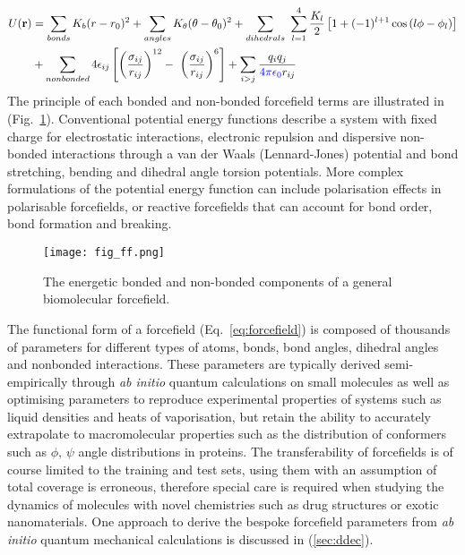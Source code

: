 %
\begin{equation} \label{eq:forcefield}
\begin{split}
U(\mathbf{r}) &= \sum_{bonds} K_b(r - r_0)^2 + \sum_{angles} K_{\theta}(\theta - \theta_0)^2 + \sum_{dihedrals} \, \, \sum_{l=1}^{4} \frac{K_{l}}{2}\left[1+(-1)^{l+1}\cos{(l\phi -\phi_{l})}\right] \\
&+ \sum_{nonbonded} 4\epsilon_{ij} \left[ \left( \frac{\sigma_{ij}}{r_{ij}}\right)^{12}-\,\,\left( \frac{\sigma_{ij}}{r_{ij}}\right)^{6} \right] + \sum_{i > j}  \frac{q_{i}q_{j}}{\textcolor{blue}{4 \pi \epsilon_{0}}r_{ij}}
\end{split}
\end{equation}
%
The principle of each bonded and non-bonded forcefield terms are illustrated in (Fig.~\ref{fig_ff}). Conventional potential energy functions describe a system with fixed charge for electrostatic interactions, electronic repulsion and dispersive non-bonded interactions through a van der Waals (Lennard-Jones) potential and bond stretching, bending and dihedral angle torsion potentials. More complex formulations of the potential energy function can include polarisation effects in polarisable forcefields,\cite{ponder2010current} or reactive forcefields that can account for bond order, bond formation and breaking.\cite{van2001reaxff}
%
\begin{figure}[H]
    \centering
    \texttt{[image: fig\_ff.png]}
    \caption{The energetic bonded and non-bonded components of a general biomolecular forcefield.}
    \label{fig_ff}
\end{figure}
%
The functional form of a forcefield (Eq.~\ref{eq:forcefield}) is composed of thousands of parameters for different types of atoms, bonds, bond angles, dihedral angles and nonbonded interactions.\cite{harder2016opls3} These parameters are typically derived semi-empirically through \textit{ab initio} quantum calculations on small molecules as well as optimising parameters to reproduce experimental properties of systems such as liquid densities and heats of vaporisation,\cite{vanommeslaeghe2010charmm} but retain the ability to accurately extrapolate to macromolecular properties such as the distribution of conformers such as $\phi,\, \psi$ angle distributions in proteins.\cite{mackerell2004improved} The transferability of forcefields is of course limited to the training and test sets, using them with an assumption of total coverage is erroneous, therefore special care is required when studying the dynamics of molecules with novel chemistries such as drug structures or exotic nanomaterials.\cite{harder2016opls3} One approach to derive the bespoke forcefield parameters from \textit{ab initio} quantum mechanical calculations is discussed in (\ref{sec:ddec}).
%
